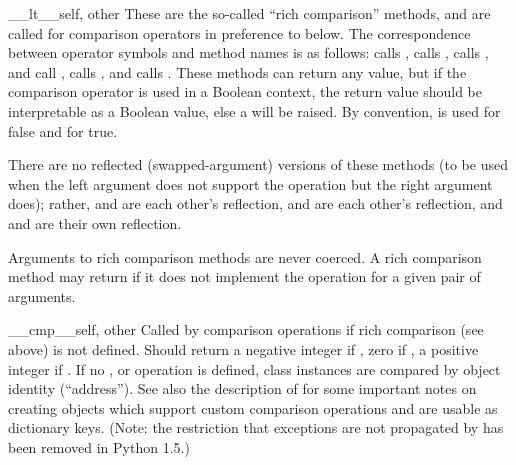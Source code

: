 \begin{methoddesc}[object]{__lt__}{self, other}
These are the so-called ``rich comparison'' methods, and are called
for comparison operators in preference to  below.
The correspondence between operator symbols and method names is as
follows:
 calls ,
 calls ,
 calls ,
 and  call
,
 calls , and
 calls .
These methods can return any value, but if the comparison operator is
used in a Boolean context, the return value should be interpretable as
a Boolean value, else a  will be raised.
By convention,  is used for false and  for true.

There are no reflected (swapped-argument) versions of these methods
(to be used when the left argument does not support the operation but
the right argument does); rather,  and
 are each other's reflection,  and
 are each other's reflection, and 
and  are their own reflection.

Arguments to rich comparison methods are never coerced.  A rich
comparison method may return  if it does not
implement the operation for a given pair of arguments.
\end{methoddesc}

\begin{methoddesc}[object]{__cmp__}{self, other}
Called by comparison operations if rich comparison (see above) is not
defined.  Should return a negative integer if ,
zero if , a positive integer if .  If no ,  or
 operation is defined, class instances are compared
by object identity (``address'').  See also the description of
 for some important notes on creating objects which
support custom comparison operations and are usable as dictionary
keys.
(Note: the restriction that exceptions are not propagated by
 has been removed in Python 1.5.)
\end{methoddesc}

